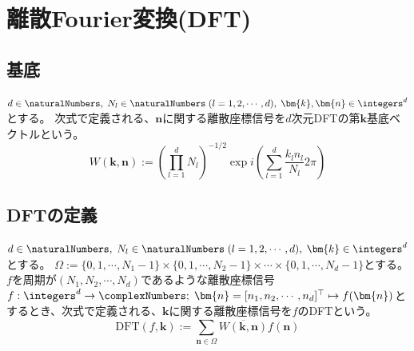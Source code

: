 		\chapter{離散Fourier変換(DFT)}
			\section{基底}
				$d\in\naturalNumbers,\;N_l\in\naturalNumbers\;(l=1,2,\cdots,d),\;\bm{k},\bm{n}\in\integers^d$とする。
				次式で定義される、$\bm{n}$に関する離散座標信号を$d$次元DFTの第$\bm{k}$基底ベクトルという。
				\[ W(\bm{k},\bm{n}) := \left(\prod_{l=1}^d N_l\right)^{-1/2} \exp i\left(\sum_{l=1}^d \frac{k_l n_l}{N_l}2\pi\right)\]

			\section{DFTの定義}
				\label{DFTの定義}
				$d\in\naturalNumbers,\;N_l\in\naturalNumbers\;(l=1,2,\cdots,d),\;\bm{k}\in\integers^d$とする。
				$\Omega := \{0,1,\cdots,N_1-1\}\times\{0,1,\cdots,N_2-1\}\times\cdots\times\{0,1,\cdots,N_d-1\}$とする。
				$f$を周期が$(N_1,N_2,\cdots,N_d)$であるような離散座標信号$f: \integers^d\to\complexNumbers;\;\bm{n} = [n_1,n_2,\cdots,n_d]^\top \mapsto f(\bm{n})$とするとき、次式で定義される、$\bm{k}$に関する離散座標信号を$f$のDFTという。
				\[ \text{DFT}(f,\bm{k}) := \sum_{\bm{n}\in\Omega} \overline{W(\bm{k},\bm{n})} f(\bm{n}) \]

